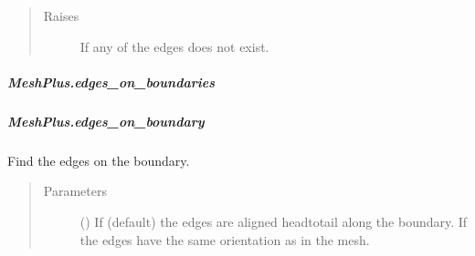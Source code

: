 \documentclass[letterpaper,10pt,english]{sphinxmanual}
\begin{document}
\begin{fulllineitems}
\begin{fulllineitems}
\begin{quote}
\begin{description}
\item[{Raises}] \leavevmode
{} \textendash{} If any of the edges does not exist.

\end{description}\end{quote}

\end{fulllineitems}



\subparagraph{MeshPlus.edges\_on\_boundaries}
\label{\detokenize{api/generated/directional_clustering.mesh.MeshPlus.edges_on_boundaries:meshplus-edges-on-boundaries}}\label{\detokenize{api/generated/directional_clustering.mesh.MeshPlus.edges_on_boundaries::doc}}

\begin{fulllineitems}
\label{\detokenize{api/generated/directional_clustering.mesh.MeshPlus.edges_on_boundaries:directional_clustering.mesh.MeshPlus.edges_on_boundaries}}
\end{fulllineitems}



\subparagraph{MeshPlus.edges\_on\_boundary}
\label{\detokenize{api/generated/directional_clustering.mesh.MeshPlus.edges_on_boundary:meshplus-edges-on-boundary}}\label{\detokenize{api/generated/directional_clustering.mesh.MeshPlus.edges_on_boundary::doc}}

\begin{fulllineitems}
\label{\detokenize{api/generated/directional_clustering.mesh.MeshPlus.edges_on_boundary:directional_clustering.mesh.MeshPlus.edges_on_boundary}}
Find the edges on the boundary.
\begin{quote}\begin{description}
\item[{Parameters}] \leavevmode
{} () \textendash{} If  (default) the edges are aligned head\sphinxhyphen{}to\sphinxhyphen{}tail along the boundary.
If  the edges have the same orientation as in the mesh.


\end{description}
\end{quote}
\end{fulllineitems}
\end{fulllineitems}
\end{document}
